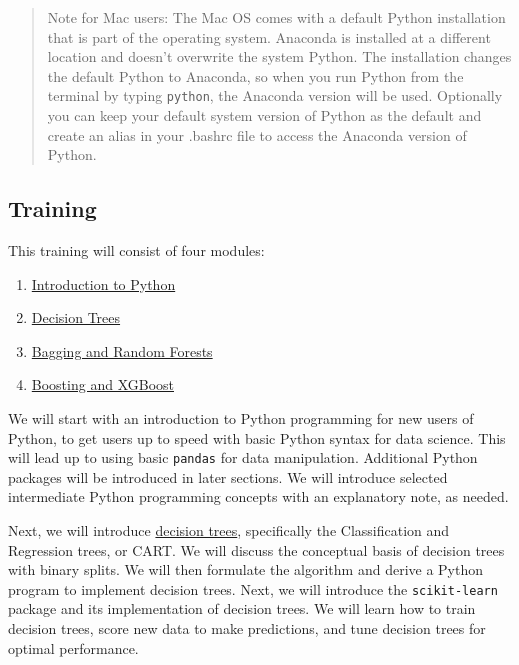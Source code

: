 \documentclass[a4paper,]{scrartcl}
\providecommand{\tightlist}{%
  \setlength{\itemsep}{0pt}\setlength{\parskip}{0pt}}
\begin{document}
\begin{quote}
Note for Mac users: The Mac OS comes with a default Python installation
that is part of the operating system. Anaconda is installed at a
different location and doesn't overwrite the system Python. The
installation changes the default Python to Anaconda, so when you run
Python from the terminal by typing \texttt{python}, the Anaconda version
will be used. Optionally you can keep your default system version of
Python as the default and create an alias in your .bashrc file to access
the Anaconda version of Python.
\end{quote}

\subsection{Training}\label{training}

This training will consist of four modules:

\begin{enumerate}
\def\labelenumi{\arabic{enumi}.}
\tightlist
\item
  \protect\hyperlink{IntroToPython}{Introduction to Python}
\item
  \protect\hyperlink{DecisionTrees}{Decision Trees}
\item
  \protect\hyperlink{RandomForests}{Bagging and Random Forests}
\item
  \protect\hyperlink{XGBoost}{Boosting and XGBoost}
\end{enumerate}

We will start with an introduction to Python programming for new users
of Python, to get users up to speed with basic Python syntax for data
science. This will lead up to using basic \texttt{pandas} for data
manipulation. Additional Python packages will be introduced in later
sections. We will introduce selected intermediate Python programming
concepts with an explanatory note, as needed.

Next, we will introduce
\href{https://en.wikipedia.org/wiki/Decision_tree_learning}{decision
trees}, specifically the Classification and Regression trees, or CART.
We will discuss the conceptual basis of decision trees with binary
splits. We will then formulate the algorithm and derive a Python program
to implement decision trees. Next, we will introduce the
\texttt{scikit-learn} package and its implementation of decision trees.
We will learn how to train decision trees, score new data to make
predictions, and tune decision trees for optimal performance.
\end{document}

